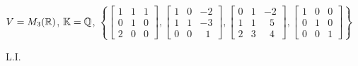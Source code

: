 \documentclass[12pt]{exam}
\begin{document}
    \begin{exercicio}
        $V = M_3(\mathbb{R})$, $\mathbb{K} = \mathbb{Q}$,
        $
            \left\{
                \begin{bmatrix}
                    1 & 1 & 1\\
                    0 & 1 & 0\\
                    2 & 0 & 0
                \end{bmatrix},
                \begin{bmatrix}
                    1 & 0 & -2\\
                    1 & 1 & -3\\
                    0 & 0 & \phantom{x} 1
                \end{bmatrix},
                \begin{bmatrix}
                    0 & 1 & -2\\
                    1 & 1 & \phantom{x} 5\\
                    2 & 3 & \phantom{x} 4
                \end{bmatrix},
                \begin{bmatrix}
                    1 & 0 & 0\\
                    0 & 1 & 0\\
                    0 & 0 & 1
                \end{bmatrix}
            \right\}
        $
        \begin{solucao}
            L.I.
        \end{solucao}
    \end{exercicio}
\end{document}
